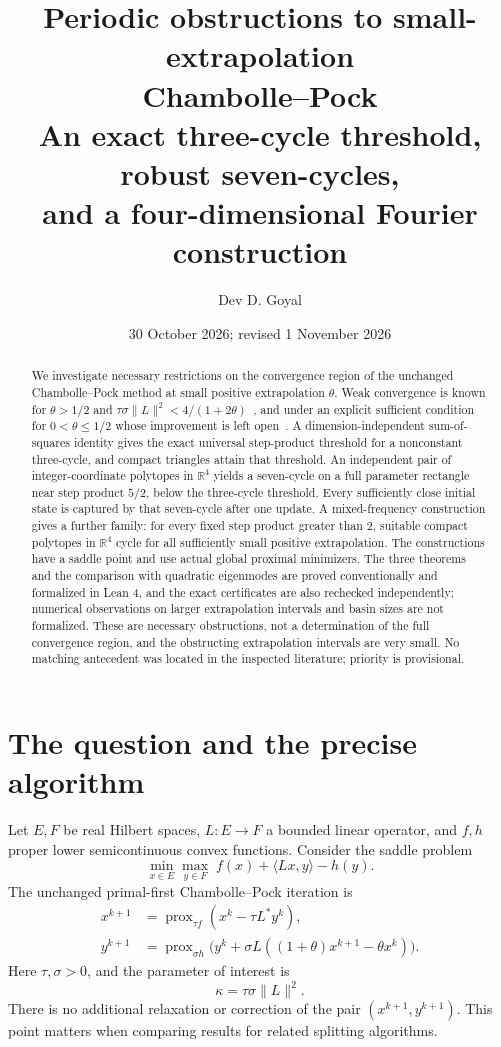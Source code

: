 \documentclass[11pt]{article}
\title{\vspace{-15mm}\textbf{Periodic obstructions to small-extrapolation\\Chambolle--Pock}\\[5pt]
\large An exact three-cycle threshold, robust seven-cycles,\\and a four-dimensional Fourier construction}
\author{Dev D. Goyal}
\date{30 October 2026; revised 1 November 2026}
\theoremstyle{remark}\newtheorem{remark}[theorem]{Remark}
\newcommand{\R}{\mathbb R}
\newcommand{\prox}{\operatorname{prox}}
\newcommand{\ip}[2]{\langle #1,#2\rangle}
\newcommand{\norm}[1]{\lVert #1\rVert}
\begin{document}
\maketitle
\thispagestyle{empty}

\begin{abstract}
We investigate necessary restrictions on the convergence region of the unchanged Chambolle--Pock method at small positive extrapolation $\theta$. Weak convergence is known for $\theta>1/2$ and $\tau\sigma\norm{L}^2<4/(1+2\theta)$~\cite{BUG}, and under an explicit sufficient condition for $0<\theta\le1/2$ whose improvement is left open~\cite{U26}. A dimension-independent sum-of-squares identity gives the exact universal step-product threshold for a nonconstant three-cycle, and compact triangles attain that threshold. An independent pair of integer-coordinate polytopes in $\R^4$ yields a seven-cycle on a full parameter rectangle near step product $5/2$, below the three-cycle threshold. Every sufficiently close initial state is captured by that seven-cycle after one update. A mixed-frequency construction gives a further family: for every fixed step product greater than $2$, suitable compact polytopes in $\R^4$ cycle for all sufficiently small positive extrapolation. The constructions have a saddle point and use actual global proximal minimizers. The three theorems and the comparison with quadratic eigenmodes are proved conventionally and formalized in Lean 4, and the exact certificates are also rechecked independently; numerical observations on larger extrapolation intervals and basin sizes are not formalized. These are necessary obstructions, not a determination of the full convergence region, and the obstructing extrapolation intervals are very small. No matching antecedent was located in the inspected literature; priority is provisional.
\end{abstract}
\tableofcontents
\newpage

\section{The question and the precise algorithm}

Let $E,F$ be real Hilbert spaces, $L:E\to F$ a bounded linear operator, and $f,h$ proper lower semicontinuous convex functions. Consider the saddle problem
\begin{equation}\label{eq:saddle}
  \min_{x\in E}\max_{y\in F}\; f(x)+\ip{Lx}{y}-h(y).
\end{equation}
The unchanged primal-first Chambolle--Pock iteration is
\begin{equation}\label{eq:cp}
\begin{aligned}
 x^{k+1}&=\prox_{\tau f}(x^k-\tau L^*y^k),\\
 y^{k+1}&=\prox_{\sigma h}\bigl(y^k+\sigma L((1+\theta)x^{k+1}-\theta x^k)\bigr).
\end{aligned}
\end{equation}
Here $\tau,\sigma>0$, and the parameter of interest is
\[
 \kappa=\tau\sigma\norm{L}^2.
\]
There is no additional relaxation or correction of the pair $(x^{k+1},y^{k+1})$. This point matters when comparing results for related splitting algorithms.
\end{document}
